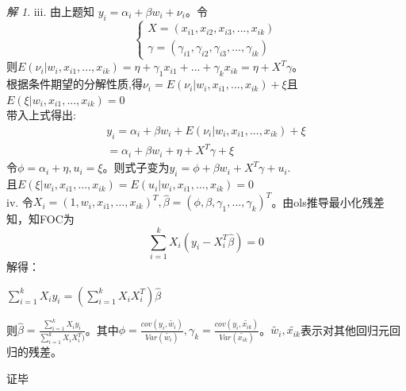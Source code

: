 \documentclass[a4paper]{ctexart}
\theoremstyle{remark}
\newtheorem*{solution}{解}
\renewcommand{\qedsymbol}{证毕}
\begin{document}
\begin{itemize}
\begin{solution}
    iii. 由上题知 $y_i = \alpha_i+\beta w_i+\nu_i$。令
    \begin{equation*}
        \begin{cases}
            X = (x_{i1}, x_{i2}, x_{i3}, ..., x_{ik})\\
            \gamma = (\gamma_{i1},\gamma_{i2}, \gamma_{i3}, ..., \gamma_{ik})
        \end{cases}
    \end{equation*}
    则$E(\nu_i|w_i, x_{i1},...,x_{ik})=\eta+\gamma_1 x_{i1}+...+\gamma_k x_{ik} = \eta + X^T\gamma$。\\
    根据条件期望的分解性质,得$\nu_i = E(\nu_i|w_i,x_{i1}, ..., x_{ik}) + \xi$且$E(\xi|w_i,x_{i1}, ..., x_{ik}) = 0$\\
    带入上式得出:
    \begin{align*}
        y_i = \alpha_i + \beta w_i + E(\nu_i|w_i,x_{i1}, ..., x_{ik}) + \xi\\
        =\alpha_i + \beta w_i + \eta + X^T\gamma +\xi
    \end{align*}
    令$\phi = \alpha_i + \eta, u_i = \xi$。则式子变为$y_i =\phi + \beta w_i + X^T\gamma + u_i$.\\且$E(\xi|w_i,x_{i1}, ..., x_{ik}) = E(u_i|w_i,x_{i1}, ..., x_{ik}) = 0$
    \\
    
    iv. 令$X_i = (1, w_i ,x_{i1}, ..., x_{ik})^T, \hat{\beta} = (\phi, \beta, \gamma_{1}, ..., \gamma_{k})^T$。由ols推导最小化残差知，知FOC为
    \begin{equation*}
        \sum_{i=1}^{k} X_i(y_i - X_i^T\hat{\beta}) = 0       
    \end{equation*}
    解得：
    \begin{center}
     $\sum_{i=1}^{k}X_iy_i = (\sum_{i=1}^{k}X_iX_i^T)\hat{\beta}$
    \end{center}
    则$\hat{\beta} = \frac{\sum_{i=1}^{k}X_iy_i}{\sum_{i=1}^{k}X_iX_i^T)}$。其中$\phi = \frac{cov(y_i,\tilde{w_i})}{Var(\tilde{w_i})},\gamma_k = \frac{cov(y_i,\widetilde{x_{ik}})}{Var(\widetilde{x_{ik}})}$。$\tilde{w_i}, \widetilde{x_{ik}}$表示对其他回归元回归的残差。%
    
    \qedsymbol
\end{solution}


\end{itemize}
\end{document}
